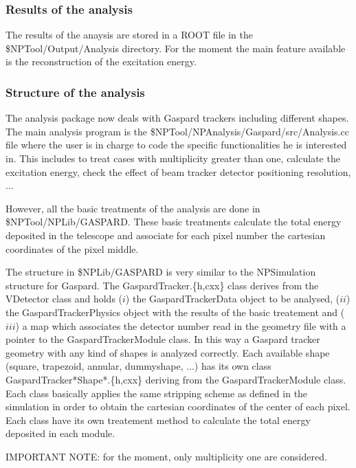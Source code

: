 \documentclass[a4paper,12pt]{article}
\begin{document}
\subsubsection{Results of the analysis}
The results of the anaysis are stored in a ROOT file in the \$NPTool/Output/Analysis
directory. For the moment the main feature available is the reconstruction of the 
excitation energy.


\subsubsection{Structure of the analysis}
The analysis package now deals with Gaspard trackers including different shapes.
The main analysis program is the \$NPTool/NPAnalysis/Gaspard/src/Analysis.cc
file where the user is in charge to code the specific functionalities he is
interested in. This includes to treat cases with multiplicity greater than one,
calculate the excitation energy, check the effect of beam tracker detector
positioning resolution, ...

However, all the basic treatments of the analysis are done in \$NPTool/NPLib/GASPARD.
These basic treatments calculate the total energy deposited in the telescope and
associate for each pixel number the cartesian coordinates of the pixel middle.

The structure in \$NPLib/GASPARD is very similar to the NPSimulation structure
for Gaspard. The GaspardTracker.\{h,cxx\} class derives from the VDetector class
and holds ($i$) the GaspardTrackerData object to be analysed, ($ii$) the
GaspardTrackerPhysics object with the results of the basic treatement and ($iii$)
a map which associates the detector number read in the geometry file with a pointer
to the GaspardTrackerModule class. In this way a Gaspard tracker geometry with any 
kind of shapes is analyzed correctly. Each available shape (square, trapezoid, annular,
dummyshape, ...) has its own class GaspardTracker*Shape*.\{h,cxx\} deriving from 
the GaspardTrackerModule class. Each class basically applies the same stripping scheme 
as defined in the simulation in order to obtain the cartesian coordinates of the center 
of each pixel. Each class have its own treatement method to calculate the total energy
deposited in each module.


IMPORTANT NOTE: for the moment, only multiplicity one are considered.
\end{document}
